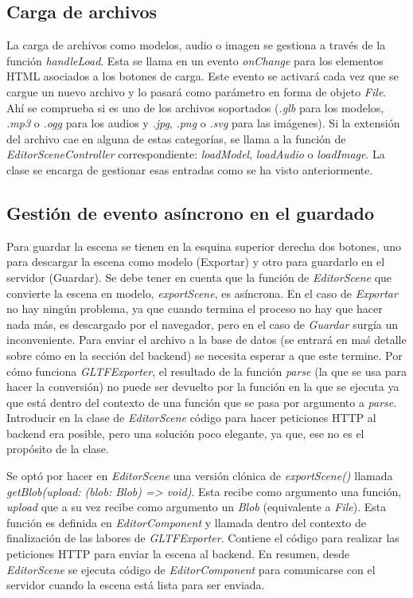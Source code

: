 \subsection{Carga de archivos}

La carga de archivos como modelos, audio o imagen se gestiona a través de la función \textit{handleLoad}. Esta se llama en un evento \textit{onChange} para los elementos HTML asociados a los botones de carga. Este evento se activará cada vez que se cargue un nuevo archivo y lo pasará como parámetro en forma de objeto \textit{File}. Ahí se comprueba si es uno de los archivos soportados (\textit{.glb} para los modelos, \textit{.mp3} o \textit{.ogg} para los audios y \textit{.jpg}, \textit{.png} o \textit{.svg} para las imágenes). Si la extensión del archivo cae en alguna de estas categorías, se llama a la función de \textit{EditorSceneController} correspondiente: \textit{loadModel}, \textit{loadAudio} o \textit{loadImage}. La clase se encarga de gestionar esas entradas como se ha visto anteriormente.

\subsection{Gestión de evento asíncrono en el guardado}

Para guardar la escena se tienen en la esquina superior derecha dos botones, uno para descargar la escena como modelo (Exportar) y otro para guardarlo en el servidor (Guardar). Se debe tener en cuenta que la función de \textit{EditorScene} que convierte la escena en modelo, \textit{exportScene}, es asíncrona. En el caso de \textit{Exportar} no hay ningún problema, ya que cuando termina el proceso no hay que hacer nada más, es descargado por el navegador, pero en el caso de \textit{Guardar} surgía un inconveniente. Para enviar el archivo a la base de datos (se entrará en maś detalle sobre cómo en la sección del backend) se necesita esperar a que este termine. Por cómo funciona \textit{GLTFExporter}, el resultado de la función \textit{parse} (la que se usa para hacer la conversión) no puede ser devuelto por la función en la que se ejecuta ya que está dentro del contexto de una función que se pasa por argumento a \textit{parse}. Introducir en la clase de \textit{EditorScene} código para hacer peticiones HTTP al backend era posible, pero una solución poco elegante, ya que, ese no es el propósito de la clase.

Se optó por hacer en \textit{EditorScene} una versión clónica de \textit{exportScene()} llamada \textit{getBlob(upload: (blob: Blob) => void)}. Esta recibe como argumento una función, \textit{upload} que a su vez recibe como argumento un \textit{Blob} (equivalente a \textit{File}). Esta función es definida en \textit{EditorComponent} y llamada dentro del contexto de finalización de las labores de \textit{GLTFExporter}. Contiene el código para realizar las peticiones HTTP para enviar la escena al backend. En resumen, desde \textit{EditorScene} se ejecuta código de \textit{EditorComponent} para comunicarse con el servidor cuando la escena está lista para ser enviada.

